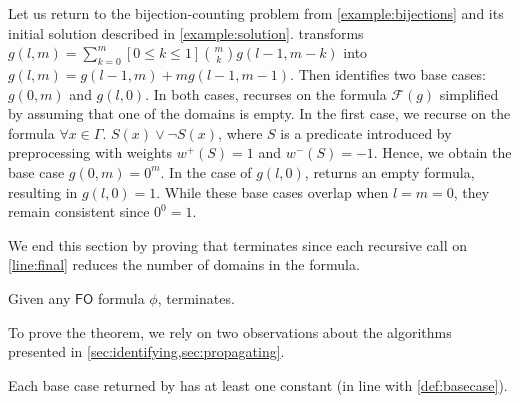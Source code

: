 \documentclass[a4paper,UKenglish,cleveref, autoref, thm-restate]{lipics-v2021}
\newcommand{\FO}{$\mathsf{FO}$}
\begin{document}
\begin{example}\label{example:bijectionstwo}
  Let us return to the bijection-counting problem from \cref{example:bijections}
  and its initial solution described in \cref{example:solution}. \Simplify
  transforms $g(l, m) = \sum_{k=0}^{m}[0 \le k \le 1]\binom{m}{k}g(l-1, m-k)$
  into $g(l, m) = g(l-1, m) + mg(l-1, m-1)$. Then \FindBaseCases identifies two
  base cases: $g(0, m)$ and $g(l, 0)$. In both cases, \CompileWithBaseCases
  recurses on the formula $\mathcal{F}(g)$ simplified by assuming that one of
  the domains is empty. In the first case, we recurse on the formula
  $\forall x \in \Gamma\text{. }S(x) \lor \neg S(x)$, where $S$ is a predicate
  introduced by preprocessing with weights $w^{+}(S) = 1$ and $w^{-}(S) = -1$.
  Hence, we obtain the base case $g(0, m) = 0^{m}$. In the case of $g(l, 0)$,
   returns an empty formula, resulting in
  $g(l, 0) = 1$. While these base cases overlap when $l = m = 0$, they remain
  consistent since $0^{0} = 1$.
\end{example}



We end this section by proving that \CompileWithBaseCases terminates since each
recursive call on \autoref{line:final} reduces the number of domains in the
formula.

\begin{theorem}
  Given any \FO{} formula $\phi$, \CompileWithBaseCases{$\phi$} terminates.
\end{theorem}


To prove the theorem, we rely on two observations about the algorithms presented
in \cref{sec:identifying,sec:propagating}.

\begin{observation}\label{observation1}
  Each base case returned by \FindBaseCases has at least one constant (in line
  with \cref{def:basecase}).
\end{observation}
\end{document}
